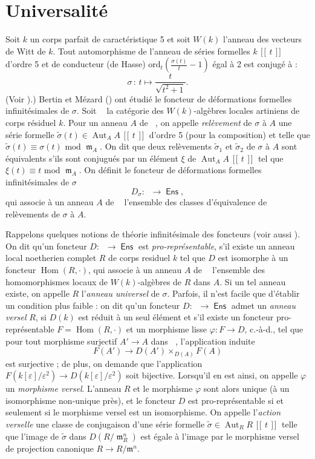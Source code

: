 \documentclass[11pt]{amsart}
\renewcommand{\tilde}{\widetilde}
\DeclareMathOperator{\Aut}{\mathrm{Aut}}
\DeclareMathOperator{\Hom}{\mathrm{Hom}}
\DeclareMathOperator{\maks}{\mathfrak{m}}
\DeclareMathOperator{\kate}{\mathsf{Art}_{\mathit k}}
\DeclareMathOperator{\psl}{\![\![\!}
\DeclareMathOperator{\psr}{\!]\!]}
\DeclareMathOperator{\Set}{\mathsf{Ens}}
\begin{document}
\section{Universalit\'e} Soit $k$ un corps parfait de caract\'eristique 5 et soit $W(k)$ l'anneau des vecteurs de Witt de $k$. Tout automorphisme de l'anneau de s\'eries formelles $k\psl t \psr$ d'ordre 5 et de conducteur (de Hasse) $\mathrm{ord}_t(\frac{\sigma(t)}{t}-1)$ \'egal \`a 2 est conjug\'e \`a : \begin{equation} \label{enp} \sigma \, : \, t \mapsto \frac{t}{\sqrt{t^2+1}}. \end{equation} (Voir \cite[4.2.1]{BM}).) Bertin et M\'ezard (\cite{BM}) ont \'etudi\'e le foncteur de d\'eformations formelles infinit\'esimales de $\sigma$. Soit $\kate$ la cat\'egorie des $W(k)$-alg\`ebres locales artiniens de corps r\'esiduel $k$. Pour un anneau $A$ de $\kate$, on appelle \emph{rel\`evement} de $\sigma$ \`a $A$ une s\'erie formelle $\tilde{\sigma}(t) \in \Aut_A A\psl t \psr$ d'ordre 5 (pour la composition) et telle  que $\tilde{\sigma}(t) \equiv {\sigma(t)} \mbox{ mod } \maks_A$. On dit que deux rel\`evements $\tilde{\sigma}_1$ et $\tilde{\sigma}_2$ de $\sigma$ \`a $A$ sont \'equivalents s'ils sont conjugu\'es par un \'el\'ement $\xi$ de $\Aut_A A\psl t \psr$ tel que $\xi(t) \equiv t \mbox{ mod } \maks_A$. On d\'efinit le foncteur de d\'eformations formelles infinit\'esimales de $\sigma$
$$D_\sigma : \kate \rightarrow \Set,$$
qui associe \`a un anneau $A$ de $\kate$ l'ensemble des classes d'\'equivalence de rel\`evements de $\sigma$ \`a $A$. 

Rappelons quelques notions de th\'eorie  infinit\'esimale des foncteurs (voir aussi \cite{schlessinger}). On dit qu'un foncteur $D \colon \kate \to \Set$ est \emph{pro-repr\'esentable}, s'il existe un anneau local noetherien complet $R$ de corps residuel $k$ tel que $D$ est isomorphe \`a un foncteur $\Hom(R,\cdot)$, qui associe \`a un anneau $A$ de $\kate$ l'ensemble des homomorphismes locaux de $W(k)$-alg\`ebres de $R$ dans $A$. Si un tel anneau existe, on appelle $R$ l'\emph{anneau universel} de $\sigma$. Parfois, il n'est facile que d'\'etablir un condition plus faible : on dit qu'un foncteur $D \colon \kate \to \Set$ admet un \emph{anneau versel} $R$, si $D(k)$ est r\'eduit \`a un seul \'el\'ement et s'il existe un foncteur pro-repr\'esentable $F=\Hom(R,\cdot)$ et un morphisme lisse $\varphi\colon F \to D$, c.-\`a-d., tel que pour tout morphisme surjectif $A' \to A$ dans $\kate$, l'application induite $$F(A')\to D(A') \times_{D(A)} F(A)$$ est surjective ; de plus, on demande que l'application $F(k[\varepsilon]/\varepsilon^2) \to D(k[\varepsilon]/\varepsilon^2)$ soit bijective. Lorsqu'il en est ainsi, on appelle $\varphi$ un \emph{morphisme versel}. L'anneau $R$ et le morphisme $\varphi$ sont alors unique (\`a un isomorphisme non-unique pr\`es), et le foncteur $D$ est pro-repr\'esentable si et seulement si le morphisme versel est un isomorphisme. On appelle l'\emph{action verselle} une classe de conjugaison d'une s\'erie formelle $\tilde{\sigma} \in \Aut_R R\psl t \psr$ telle que l'image de $\tilde{\sigma}$ dans $D(R/\maks_R^n)$ est \'egale \`a l'image par le morphisme versel de projection canonique $R \to R/\mathfrak{m}^n$. 
\end{document}
